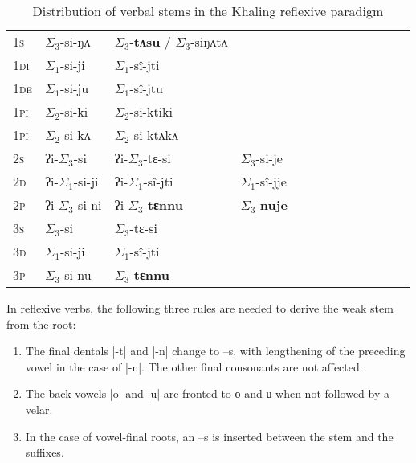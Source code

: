 \documentclass[twoside,a4paper,11pt]{article}
\newcommand{\ipa}[1]{{\phon#1}}
\newcommand{\grise}[1]{\cellcolor{lightgray}\textbf{#1}}
\newcommand{\grisf}[1]{\cellcolor{gray}\textbf{#1}}
\newcommand{\ra}{$\Sigma_1$}
\newcommand{\rbb}{$\Sigma_2$}
\newcommand{\rc}{$\Sigma_3$}
\begin{document}
\begin{table}[h]
\caption{ Distribution of verbal stems in the Khaling reflexive paradigm}
\label{tab:reflstems} \centering 
\begin{tabular}{l|l|l|l|l|l|l|l|l|l|l|l|l}  \toprule
\textsc{1s}  &  \ipa{\rc{}-si-ŋʌ}   &  \ipa{\rc{}-\textbf{tʌsu}} / \ipa{\rc{}-siŋʌtʌ}   \\ 
\textsc{1di}  &  \ipa{\ra{}-si-ji}  \grise{} &  \ipa{\ra{}-sî-jti} \grise{} \\
\textsc{1de}  &  \ipa{\ra{}-si-ju} \grise{}   &  \ipa{\ra{}-sî-jtu} \grise{} \\ 
\textsc{1pi}  &  \ipa{\rbb{}-si-ki} \grisf{}  &  \ipa{\rbb{}-si-ktiki} \grisf{}  \\ 
\textsc{1pi}  &  \ipa{\rbb{}-si-kʌ}  \grisf{}   &  \ipa{\rbb{}-si-ktʌkʌ} \grisf{} \\ 
\midrule
\textsc{2s}  &  \ipa{ʔi-\rc{}-si}   &  \ipa{ʔi-\rc{}-tɛ-si}   &  \ipa{\rc{}-si-je} \\ 
\textsc{2d}  &  \ipa{ʔi-\ra{}-si-ji}  \grise{}  &  \ipa{ʔi-\ra{}-sî-jti} \grise{}   &  \ipa{\ra{}-sî-jje} \grise{} \\
\textsc{2p}  &  \ipa{ʔi-\rc{}-si-ni}   &  \ipa{ʔi-\rc{}-\textbf{tɛnnu}}   &  \ipa{\rc{}-\textbf{nuje}}  \\ 
\midrule
\textsc{3s}  &  \ipa{\rc{}-si}   &  \ipa{\rc{}-tɛ-si} \\ 
\textsc{3d}  &  \ipa{\ra{}-si-ji} \grise{}   &  \ipa{\ra{}-sî-jti}\grise{} \\ 
\textsc{3p}  &  \ipa{\rc{}-si-nu}   &  \ipa{\rc{}-\textbf{tɛnnu}}  \\ 
\bottomrule
\end{tabular}
\end{table}

In reflexive verbs, the following three rules are needed to derive the weak stem from the root:

\begin{enumerate}
\item The final dentals |-t| and |-n| change to --\ipa{s}, with lengthening of the preceding  vowel in the case of |-n|. The other final consonants are not affected.
\item The back vowels |o| and |u| are fronted to \ipa{ɵ} and \ipa{ʉ} when not followed by a velar.
\item In the case of vowel-final roots, an --\ipa{s} is inserted between the stem and the suffixes.
\end{enumerate}
 
\end{document}
